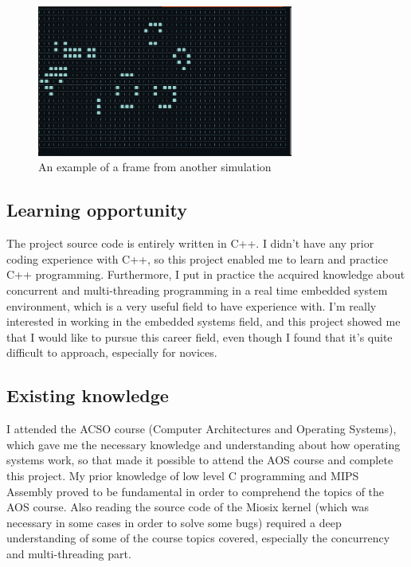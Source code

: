 \documentclass[10pt]{article}
\begin{document}
\begin{figure}[h!]
    \centering
    \includegraphics[width=0.75\textwidth]{images/game2.png}
    \caption{An example of a frame from another simulation}
    \label{fig:running}
\end{figure}

\subsection{Learning opportunity}

The project source code is entirely written in C++. I didn't have any prior coding experience with C++, so this project enabled me to learn and practice C++ programming.
Furthermore, I put in practice the acquired knowledge about concurrent and multi-threading programming in a real time embedded system environment, which is a very useful field to have experience with. 
I'm really interested in working in the embedded systems field, and this project showed me that I would like to pursue this career field, even though I found that it's quite difficult to approach, especially for novices. 

\subsection{Existing knowledge}

I attended the ACSO course (Computer Architectures and Operating Systems), which gave me the necessary knowledge and understanding about how operating systems work, so that made it possible to attend the AOS course and complete this project.
My prior knowledge of low level C programming and MIPS Assembly proved to be fundamental in order to comprehend the topics of the AOS course. Also reading the source code of the Miosix kernel (which was necessary in some cases in order to solve some bugs) required a deep understanding of some of the course topics covered, especially the concurrency and multi-threading part.
\end{document}
